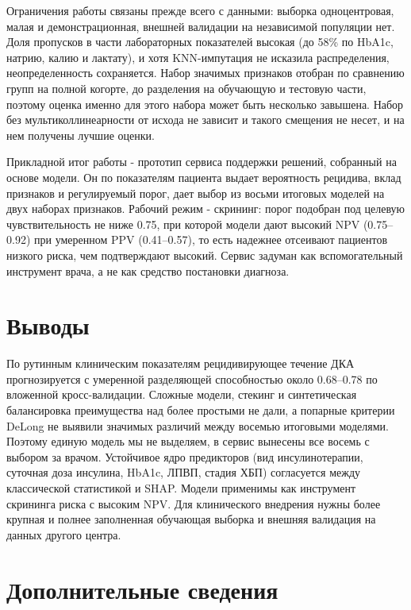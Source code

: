 \documentclass[12pt,a4paper]{article}
\begin{document}
Ограничения работы связаны прежде всего с данными: выборка одноцентровая, малая и
демонстрационная, внешней валидации на независимой популяции нет. Доля пропусков в части
лабораторных показателей высокая (до 58\% по HbA1c, натрию, калию и лактату), и хотя
KNN-импутация не исказила распределения, неопределенность сохраняется. Набор значимых
признаков отобран по сравнению групп на полной когорте, до разделения на обучающую и тестовую
части, поэтому оценка именно для этого набора может быть несколько завышена. Набор без
мультиколлинеарности от исхода не зависит и такого смещения не несет, и на нем получены лучшие
оценки.

Прикладной итог работы - прототип сервиса поддержки решений, собранный на основе модели. Он по
показателям пациента выдает вероятность рецидива, вклад признаков и регулируемый порог, дает
выбор из восьми итоговых моделей на двух наборах признаков. Рабочий режим - скрининг: порог
подобран под целевую чувствительность не ниже 0.75, при которой модели дают высокий NPV
(0.75--0.92) при умеренном PPV (0.41--0.57), то есть надежнее отсеивают пациентов низкого
риска, чем подтверждают высокий. Сервис задуман как вспомогательный инструмент врача, а не как
средство постановки диагноза.

\section{Выводы}

По рутинным клиническим показателям рецидивирующее течение ДКА прогнозируется с умеренной
разделяющей способностью около 0.68--0.78 по вложенной кросс-валидации. Сложные модели, стекинг
и синтетическая балансировка преимущества над более простыми не дали, а попарные критерии
DeLong не выявили значимых различий между восемью итоговыми моделями. Поэтому единую модель мы
не выделяем, в сервис вынесены все восемь с выбором за врачом. Устойчивое ядро предикторов (вид
инсулинотерапии, суточная доза инсулина, HbA1c, ЛПВП, стадия ХБП) согласуется между
классической статистикой и SHAP. Модели применимы как инструмент скрининга риска с высоким NPV. Для
клинического внедрения нужны более крупная и полнее заполненная обучающая выборка и внешняя
валидация на данных другого центра.

\section*{Дополнительные сведения}
\end{document}

